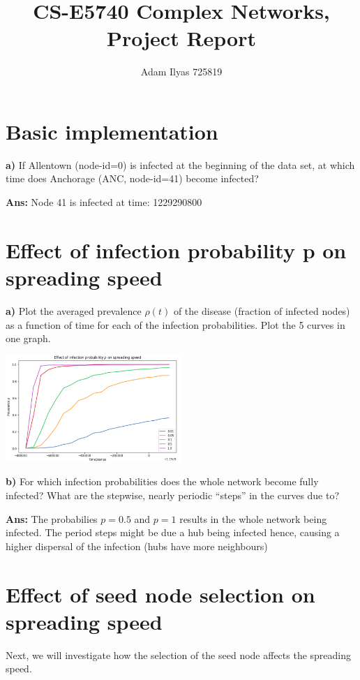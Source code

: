 \documentclass[a4paper,12pt]{article}
\author{Adam Ilyas 725819}
\title{
CS-E5740 Complex Networks, \\
Project Report
}
\begin{document}
\vspace{8pt}
\setlength\parindent{0pt}
\maketitle
\section{Basic implementation}

\textbf{a)} If Allentown (node-id=0) is infected at the beginning of the data set, at which time
does Anchorage (ANC, node-id=41) become infected?

\bigskip
\textbf{Ans: }Node 41 is infected at time: 1229290800

\section{Effect of infection probability p on spreading speed}

\textbf{a)} Plot the averaged prevalence $\rho(t)$ of the disease (fraction of infected nodes) as a
function of time for each of the infection probabilities. Plot the 5 curves in one graph.

\begin{center}
\includegraphics[width=0.5\textwidth]{q2}
\end{center}

\textbf{b)}  For which infection probabilities does the whole network become fully infected?
What are the stepwise, nearly periodic “steps” in the curves due to?

\bigskip
\textbf{Ans: }The probabilies $p=0.5$ and $p=1$ results in the whole network being infected.
The period steps might be due a hub being infected hence, causing a higher dispersal of the infection (hubs have
more neighbours)

\section{Effect of seed node selection on spreading speed}
Next, we will investigate how the selection of the seed node affects the spreading speed.
\end{document}
